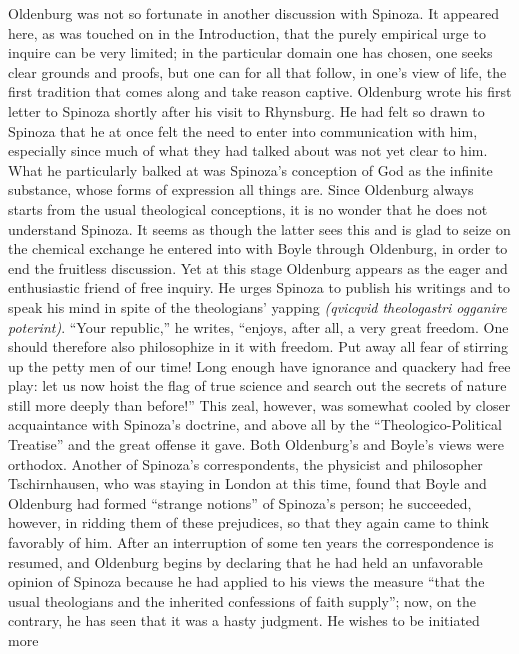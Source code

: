 \documentclass[12pt]{book}
\newcommand{\opage}[1]{\marginnote{\footnotesize\textit{[#1]}}}
\begin{document}
Oldenburg was not so fortunate in another discussion with Spinoza. It appeared here,
as was touched on in the Introduction, that the purely empirical urge to inquire can be
very limited; in the particular domain one has chosen, one seeks clear grounds and
proofs, but one can for all that follow, in one's view of life, the first tradition
that comes along and take reason captive. Oldenburg wrote his first letter to Spinoza
shortly after his visit to Rhynsburg. He had felt \opage{47}so drawn to Spinoza that he
at once felt the need to enter into communication with him, especially since much of
what they had talked about was not yet clear to him. What he particularly balked at was
Spinoza's conception of God as the infinite substance, whose forms of expression all
things are. Since Oldenburg always starts from the usual theological conceptions, it is
no wonder that he does not understand Spinoza. It seems as though the latter sees this
and is glad to seize on the chemical exchange he entered into with Boyle through
Oldenburg, in order to end the fruitless discussion. Yet at this stage Oldenburg
appears as the eager and enthusiastic friend of free inquiry. He urges Spinoza to
publish his writings and to speak his mind in spite of the theologians' yapping
\textit{(qvicqvid theologastri ogganire poterint)}. ``Your republic,'' he writes,
``enjoys, after all, a very great freedom. One should therefore also philosophize in it
with freedom. Put away all fear of stirring up the petty men of our time! Long enough
have ignorance and quackery had free play: let us now hoist the flag of true science
and search out the secrets of nature still more deeply than before!'' This zeal,
however, was somewhat cooled by closer acquaintance with Spinoza's doctrine, and above
all by the ``Theologico-Political Treatise'' and the great offense it gave. Both
Oldenburg's and Boyle's views were orthodox. Another of Spinoza's correspondents, the
physicist and philosopher Tschirnhausen, who was staying in London at this time, found
that Boyle and Oldenburg had formed ``strange notions'' of Spinoza's person; he
succeeded, however, in ridding them of these prejudices, so that they again came to
think favorably of him. After an interruption of some ten \opage{48}years the
correspondence is resumed, and Oldenburg begins by declaring that he had held an
unfavorable opinion of Spinoza because he had applied to his views the measure ``that
the usual theologians and the inherited confessions of faith supply''; now, on the
contrary, he has seen that it was a hasty judgment. He wishes to be initiated more
\end{document}

